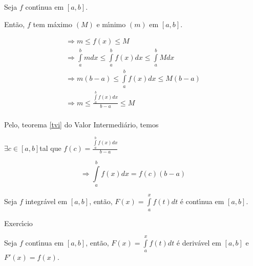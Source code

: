 \documentclass{book}
\begin{document}
\begin{dem}

Seja $f$ cont\'{\i}nua em $\left[ {a,b} \right]$.

Ent\~ao, $f$ tem m\'aximo $\left( M \right)$ e m\'{\i}nimo $\left( m
\right)$ em $\left[ {a,b} \right]$.

\[
\begin{array}{l}
\Rightarrow m \leqslant f\left( x \right) \leqslant M \\
\Rightarrow \int\limits_a^b {mdx} \leqslant \int\limits_a^b {f\left( x
\right)dx} \leqslant \int\limits_a^b {Mdx} \\
\Rightarrow m\left( {b - a} \right) \leqslant \int\limits_a^b {f\left( x
\right)dx} \leqslant M\left( {b - a} \right) \\
\Rightarrow m \leqslant \frac{\int\limits_a^b {f\left( x \right)dx} }{b -
a} \leqslant M \\
\end{array}
\]


Pelo, teorema \ref{tvi} do Valor Intermedi\'ario, temos

$\exists c \in \left[ {a,b} \right]$tal que $f\left( c \right) =
\frac{\int\limits_a^b {f\left( x \right)dx} }{b - a}$

\[
\Rightarrow \int\limits_a^b {f\left( x \right)dx} = f\left( c \right)\left(
{b - a} \right)
\]


\end{dem}


\begin{teo}

Seja $f$ integr\'avel em $\left[ {a,b} \right]$, ent\~ao, $F\left( x
\right) = \int\limits_a^x {f\left( t \right)dt} $ \'{e} cont\'{\i}nua em
$\left[ {a,b} \right]$.

\end{teo}



\begin{dem}

Exerc\'{\i}cio

\end{dem}



\begin{teo}

Seja $f$ cont\'{\i}nua em $\left[ {a,b} \right]$, ent\~ao, $F\left( x
\right) = \int\limits_a^x {f\left( t \right)dt} $ \'{e} deriv\'avel em
$\left[ {a,b} \right]$ e $F'\left( x \right) = f\left( x \right)$.

\end{teo}
\end{document}
